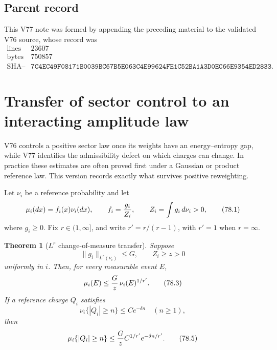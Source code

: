 \documentclass[11pt]{article}
\newtheorem{theorem}{Theorem}[section]
\begin{document}
\subsection{Parent record}

This V77 note was formed by appending the preceding material to the
validated V76 source, whose record was
\[
\begin{array}{c|c}
\text{lines}&23607\\
\text{bytes}&750857\\
\text{SHA--256}&
\texttt{7C4EC49F08171B0039BC67B5E063C4E99624FE1C52BA1A3D0EC66E9354ED2833}.
\end{array}                                                     \tag{77.13}
\]


\section{Transfer of sector control to an interacting amplitude law}
\label{sec:v11v78}

V76 controls a positive sector law once its weights have an
energy--entropy gap, while V77 identifies the admissibility defect on
which charges can change.  In practice these estimates are often
proved first under a Gaussian or product reference law.  This version
records exactly what survives positive reweighting.

Let \(\nu_i\) be a reference probability and let
\[
 \mu_i(dx)=f_i(x)\nu_i(dx),\qquad
 f_i={g_i\over Z_i},\qquad
 Z_i=\int g_i\,d\nu_i>0,                                     \tag{78.1}
\]
where \(g_i\ge0\).  Fix \(r\in(1,\infty]\), and write
\(r'=r/(r-1)\), with \(r'=1\) when \(r=\infty\).

\begin{theorem}[\(L^r\) change-of-measure transfer]
\label{thm:v11v78-holder}
Suppose
\[
                         \|g_i\|_{L^r(\nu_i)}\le G,\qquad
                         Z_i\ge z>0                           \tag{78.2}
\]
uniformly in \(i\).  Then, for every measurable event \(E\),
\[
             \mu_i(E)\le {G\over z}\,
                    \nu_i(E)^{1/r'}.                         \tag{78.3}
\]
If a reference charge \(Q_i\) satisfies
\[
             \nu_i\{|Q_i|\ge n\}\le C e^{-\delta n}
                    \quad(n\ge1),                            \tag{78.4}
\]
then
\[
             \mu_i\{|Q_i|\ge n\}
             \le {G\over z}C^{1/r'}
                    e^{-\delta n/r'}.                        \tag{78.5}
\]
\end{theorem}
\end{document}
